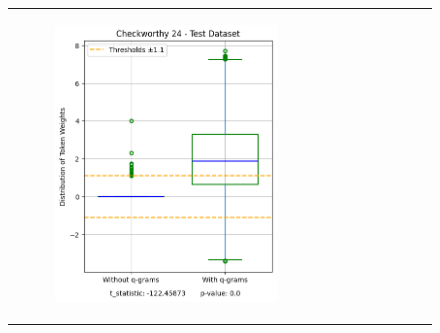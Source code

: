 \documentclass[runningheads,10pt]{llncs}
\begin{document}
\begin{figure}[t]
    \begin{tabular}{c c c}
        \begin{subfigure}{0.32\textwidth}
            \centering
            \includegraphics[width=\linewidth]{fig_checkworthy_24_test.png}
            \label{fig:image4}
        \end{subfigure} &
        \begin{subfigure}{0.32\textwidth}
            \centering

\end{subfigure}
\end{tabular}
\end{figure}
\end{document}
